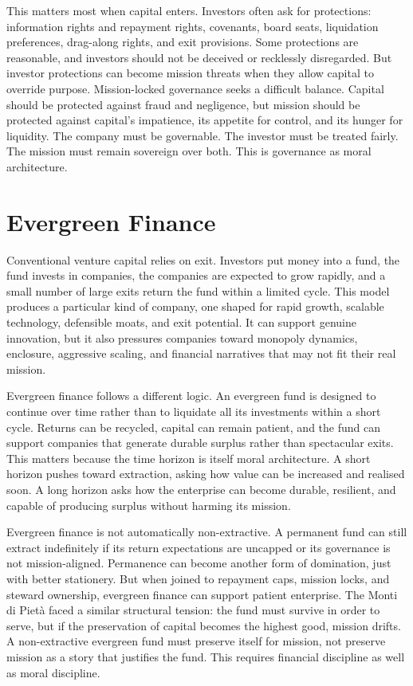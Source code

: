 \documentclass[11pt,a4paper,oneside]{book}
\begin{document}
This matters most when capital enters. Investors often ask for protections: information rights and repayment rights, covenants, board seats, liquidation preferences, drag-along rights, and exit provisions. Some protections are reasonable, and investors should not be deceived or recklessly disregarded. But investor protections can become mission threats when they allow capital to override purpose. Mission-locked governance seeks a difficult balance. Capital should be protected against fraud and negligence, but mission should be protected against capital's impatience, its appetite for control, and its hunger for liquidity. The company must be governable. The investor must be treated fairly. The mission must remain sovereign over both. This is governance as moral architecture.

\section*{Evergreen Finance}

Conventional venture capital relies on exit. Investors put money into a fund, the fund invests in companies, the companies are expected to grow rapidly, and a small number of large exits return the fund within a limited cycle. This model produces a particular kind of company, one shaped for rapid growth, scalable technology, defensible moats, and exit potential. It can support genuine innovation, but it also pressures companies toward monopoly dynamics, enclosure, aggressive scaling, and financial narratives that may not fit their real mission.

Evergreen finance follows a different logic. An evergreen fund is designed to continue over time rather than to liquidate all its investments within a short cycle. Returns can be recycled, capital can remain patient, and the fund can support companies that generate durable surplus rather than spectacular exits. This matters because the time horizon is itself moral architecture. A short horizon pushes toward extraction, asking how value can be increased and realised soon. A long horizon asks how the enterprise can become durable, resilient, and capable of producing surplus without harming its mission.

Evergreen finance is not automatically non-extractive. A permanent fund can still extract indefinitely if its return expectations are uncapped or its governance is not mission-aligned. Permanence can become another form of domination, just with better stationery. But when joined to repayment caps, mission locks, and steward ownership, evergreen finance can support patient enterprise. The Monti di Pietà faced a similar structural tension: the fund must survive in order to serve, but if the preservation of capital becomes the highest good, mission drifts. A non-extractive evergreen fund must preserve itself for mission, not preserve mission as a story that justifies the fund. This requires financial discipline as well as moral discipline.
\end{document}
